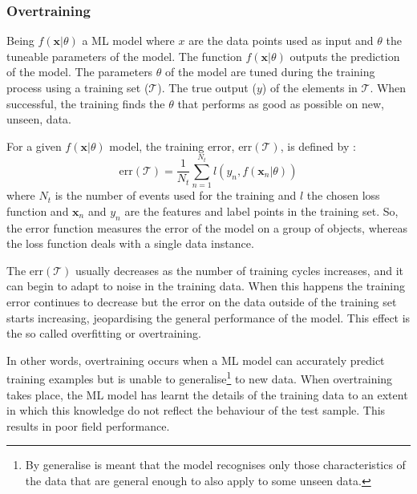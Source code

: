 \subsubsection{Overtraining}
\label{chap:Appendix:BDT:Overtraining} 

Being $f(\bm{x}|\theta)$ a ML model where $x$ are the data points used as input and $\theta$
the tuneable parameters of the model. The function $f(\bm{x}|\theta)$ outputs the prediction of the model.
The parameters $\theta$ of the model are tuned during the training process using a training set 
($\mathcal{T}$). The true output ($y$) of the elements in $\mathcal{T}$.
When successful, the training finds the $\theta$ that performs as good as possible on new, 
unseen, data.

For a given $f(\bm{x}|\theta)$ model, the training error, $\text{err}(\mathcal{T})$, is defined by 
\cite{zimmermann2006statistical}:
\begin{equation}
\label{eq:Appendix:BDT:ErrorOfTest}
	\text{err}(\mathcal{T}) = \frac{1}{N_t} \sum_{n=1}^{N_t} l(y_{n}, f(\bm{x}_{n}|\theta)) 
\end{equation}
where $N_t$ is the number of events used for the training and $l$ the chosen loss function and
$\bm{x}_n$ and $y_n$ are the features and label points in the training set. So, the error function measures the  
error of the model on a group of objects, whereas the loss function deals with a single data instance.

The $\text{err}(\mathcal{T})$ usually decreases as the number of training cycles increases, and it can begin 
 to adapt to noise in the training data. When this happens the training error continues to 
 decrease but the error on the data outside of the training set starts increasing, jeopardising
 the general performance of the model. This effect is the so called overfitting or overtraining.
 

In other words, overtraining occurs when a ML model can accurately predict training examples but is 
unable to generalise\footnote{By generalise is meant that the model recognises only 
those characteristics of the data that are general enough to also apply to some unseen data.}
 to new data.  When overtraining takes place, the ML model has learnt
the details of the training data to an extent in which this knowledge do not reflect the 
behaviour of the test sample.  This results in poor field performance. 

